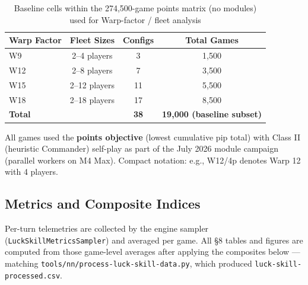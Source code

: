 \documentclass[11pt,letterpaper]{article}
\begin{document}
\begin{table}[h]
\centering
\begin{tabular}{@{}lccc@{}}
\toprule
\textbf{Warp Factor} & \textbf{Fleet Sizes} & \textbf{Configs} & \textbf{Total Games} \\
\midrule
W9 & 2--4 players & 3 & 1,500 \\
W12 & 2--8 players & 7 & 3,500 \\
W15 & 2--12 players & 11 & 5,500 \\
W18 & 2--18 players & 17 & 8,500 \\
\midrule
\textbf{Total} & & \textbf{38} & \textbf{19{,}000 (baseline subset)} \\
\bottomrule
\end{tabular}
\caption{Baseline cells within the 274{,}500-game points matrix (no modules) used for Warp-factor / fleet analysis}
\end{table}

All games used the \textbf{points objective} (lowest cumulative pip total) with Class II (heuristic Commander) self-play as part of the July 2026 module campaign (parallel workers on M4 Max). Compact notation: e.g., W12/4p denotes Warp 12 with 4 players.

\subsection{Metrics and Composite Indices}
\label{sec:luck-skill-instrument}

Per-turn telemetries are collected by the engine sampler (\texttt{LuckSkillMetricsSampler}) and averaged per game. All §8 tables and figures are computed from those game-level averages after applying the composites below --- matching \texttt{tools/nn/process-luck-skill-data.py}, which produced \texttt{luck-skill-processed.csv}.
\end{document}
